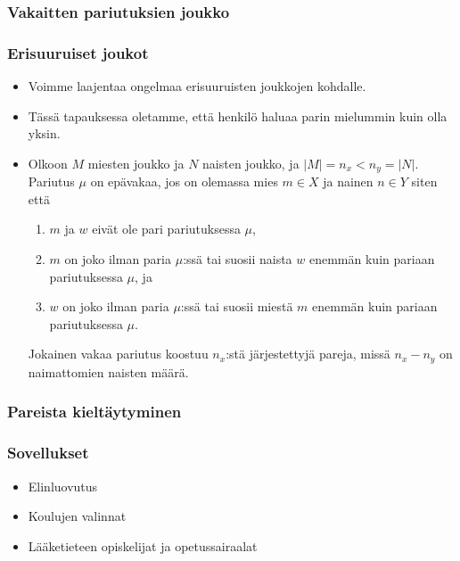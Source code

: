 \documentclass{beamer}
\begin{document}
  \begin{frame}
  	\frametitle{Vakaitten pariutuksien joukko}
  \end{frame}
  \begin{frame}
  	\frametitle{Erisuuruiset joukot}
  	\begin{itemize}
  		\item Voimme laajentaa ongelmaa erisuuruisten joukkojen kohdalle.
  		\item Tässä tapauksessa oletamme, että henkilö haluaa parin mielummin kuin olla yksin.
  		\item Olkoon $M$ miesten joukko ja $N$ naisten joukko, ja $|M| = n_x < n_y = |N|$. Pariutus $\mu$ on epävakaa, jos on olemassa mies $m \in X$ ja nainen $n \in Y$ siten että

\begin{enumerate}
	\item $m$ ja $w$ eivät ole pari pariutuksessa $\mu$,
	\item $m$ on joko ilman paria $\mu$:ssä tai suosii naista $w$ enemmän kuin pariaan pariutuksessa $\mu$, ja
	\item $w$ on joko ilman paria $\mu$:ssä tai suosii miestä $m$ enemmän kuin pariaan pariutuksessa $\mu$.
\end{enumerate}
Jokainen vakaa pariutus koostuu $n_x$:stä järjestettyjä pareja, missä $n_x - n_y$ on naimattomien naisten määrä.
  		
  	\end{itemize}
  \end{frame}
  \begin{frame}
  	\frametitle{Pareista kieltäytyminen}
  \end{frame}
  \begin{frame}
  	\frametitle{Sovellukset}
  	\begin{itemize}
  		\item Elinluovutus
  		\item Koulujen valinnat
  		\item Lääketieteen opiskelijat ja opetussairaalat
  	\end{itemize}
  \end{frame}
\end{document}

